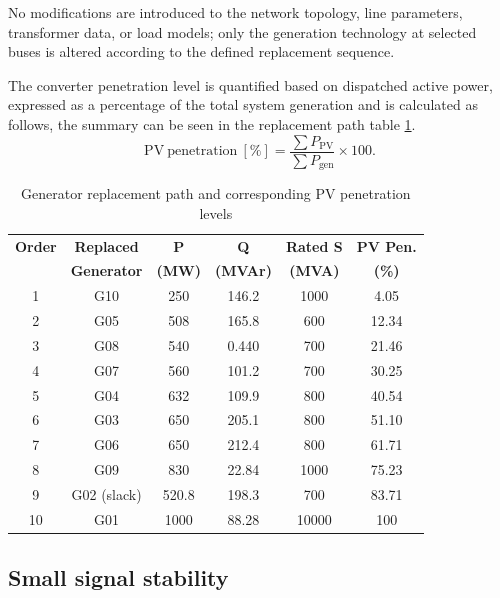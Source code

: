 No modifications are introduced to the network topology, line parameters, transformer data, or load models; only the generation technology at selected buses is altered according to the defined replacement sequence.

The converter penetration level is quantified based on dispatched active power, expressed as a percentage of the total system generation and is calculated as follows, the summary can be seen in the replacement path table \ref{tab:replacement_path}.
\begin{equation}
\mathrm{PV\ penetration}~[\%] = \frac{\sum P_{\mathrm{PV}}}{\sum P_{\mathrm{gen}}}\times 100 .
\end{equation}

\begin{table}[htbp!]
    \centering
    \caption{Generator replacement path and corresponding PV penetration levels}
    \label{tab:replacement_path}
    \begin{tabular}{cccccc}
    \toprule
    \textbf{Order} & \textbf{Replaced} & \textbf{P} & \textbf{Q} & \textbf{Rated S} & \textbf{PV Pen.} \\
     & \textbf{Generator} & \textbf{(MW)} & \textbf{(MVAr)} & \textbf{(MVA)} & \textbf{(\%)} \\
    \midrule
    1  & G10           & 250  & 146.2  & 1000 & 4.05\\
    2  & G05           & 508  & 165.8  & 600  & 12.34 \\
    3  & G08           & 540  & 0.440  & 700 & 21.46 \\
    4  & G07           & 560  & 101.2  & 700  & 30.25 \\
    5  & G04           & 632  & 109.9  & 800  & 40.54  \\
    6  & G03           & 650  & 205.1  & 800  & 51.10\\
    7  & G06           & 650  & 212.4  & 800 & 61.71\\
    8  & G09           & 830  & 22.84  & 1000  & 75.23  \\
    9  & G02 (slack)   & 520.8 & 198.3 & 700 & 83.71 \\
    10 & G01           & 1000 & 88.28  & 10000 & 100   \\
    \bottomrule
\end{tabular}
\end{table}



\subsection{Small signal stability}
